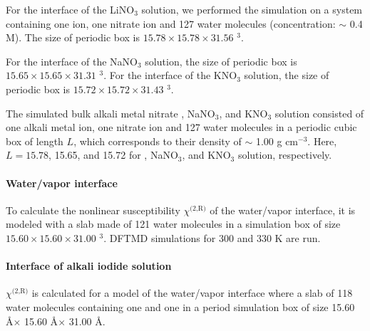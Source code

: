 For the interface of the LiNO$_3$ solution, we performed the simulation on a system containing one \Li ion, one nitrate ion 
and 127 water molecules (concentration: $\sim$ 0.4 M). 
The size of periodic box is $15.78 \times 15.78 \times 31.56$ \A$^3$.

For the interface of the NaNO$_3$ solution, the size of periodic box is $15.65 \times 15.65 \times 31.31$ \A$^3$. %
For the interface of the KNO$_3$ solution, the size of periodic box is $15.72 \times 15.72 \times 31.43$ \A$^3$. %

The simulated bulk alkali metal nitrate \LiN, NaNO$_3$, and KNO$_3$ solution consisted of one alkali metal ion, 
one nitrate ion and 127 water molecules in a periodic cubic box of length $L$, which corresponds to their density of $\sim$ 1.00 g cm$^{-3}$. 
Here, $L=15.78$, 15.65, and 15.72 for \LiN, NaNO$_3$, and KNO$_3$ solution, respectively.


\paragraph{Water/vapor interface}
To calculate the nonlinear susceptibility $\chi^\text{(2,R)}$ of the water/vapor interface, it is modeled with a slab 
made of 121 water molecules in a simulation box of size $15.60 \times 15.60 \times 31.00$ \A$^3$. 
DFTMD simulations for 300 and 330 K are run.

\paragraph{Interface of alkali iodide solution}
$\chi^\text{(2,R)}$ is calculated for a model of the water/vapor interface where a slab of 118 
water molecules containing one \Li and one \I in a period simulation box of size 15.60 \AA $\times$ 15.60 \AA $\times$ 31.00 \AA.

